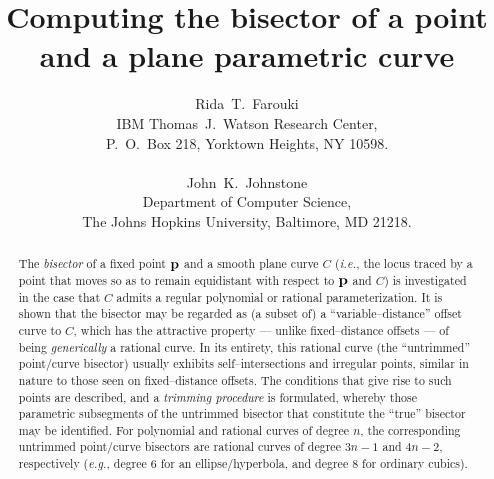 


\title{
Computing the bisector of a point \\
and a plane parametric curve
}

\author{
Rida~T.~Farouki \\
IBM Thomas~J.~Watson Research Center, \\
P.~O.~Box 218, Yorktown Heights, NY 10598. \\ \\
John~K.~Johnstone \\
Department of Computer Science, \\
The Johns Hopkins University, Baltimore, MD 21218.
}

\date{}

\maketitle
\thispagestyle{empty}

\begin{abstract}
The {\it bisector\/} of a fixed point ${\bf p}$ and a
smooth plane curve $C$ ({\it i.e.}, the locus traced by a
point that moves so as to remain equidistant with respect
to ${\bf p}$ and $C$) is investigated in the case that $C$
admits a regular polynomial or rational parameterization.
It is shown that the bisector may be regarded as (a subset
of) a ``variable--distance'' offset curve to $C$, which has
the attractive property --- unlike fixed--distance offsets
--- of being {\it generically\/} a rational curve. In its
entirety, this rational curve (the ``untrimmed'' point/curve
bisector) usually exhibits self--intersections and irregular
points, similar in nature to those seen on fixed--distance
offsets. The conditions that give rise to such points are
described, and a {\it trimming procedure} is formulated,
whereby those parametric subsegments of the untrimmed
bisector that constitute the ``true'' bisector may be
identified. For polynomial and rational curves of degree
$n$, the corresponding untrimmed point/curve bisectors are
rational curves of degree $3n-1$ and $4n-2$, respectively
({\it e.g.}, degree 6 for an ellipse/hyperbola, and degree
8 for ordinary cubics).
\end{abstract}



